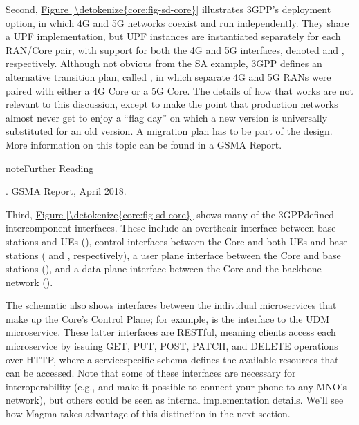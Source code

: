 \documentclass[a4paper,11pt,english]{sphinxmanual}
\begin{document}
\sphinxAtStartPar
Second, \hyperref[\detokenize{core:fig-sd-core}]{Figure \ref{\detokenize{core:fig-sd-core}}} illustrates 3GPP’s
 deployment option, in which 4G and 5G networks
co\sphinxhyphen{}exist and run independently. They share a UPF implementation, but
UPF instances are instantiated separately for each RAN/Core pair, with
support for both the 4G and 5G interfaces, denoted  and ,
respectively.  Although not obvious from the SA example, 3GPP defines
an alternative transition plan, called , in
which separate 4G and 5G RANs were paired with either a 4G Core or a
5G Core. The details of how that works are not relevant to this
discussion, except to make the point that production networks almost
never get to enjoy a “flag day” on which a new version is universally
substituted for an old version. A migration plan has to be part of the
design. More information on this topic can be found in a GSMA Report.

\label{\detokenize{core:reading-migration}}
\begin{sphinxadmonition}{note}{Further Reading}

\sphinxAtStartPar
{}.
GSMA Report, April 2018.
\end{sphinxadmonition}

\sphinxAtStartPar
Third, \hyperref[\detokenize{core:fig-sd-core}]{Figure \ref{\detokenize{core:fig-sd-core}}} shows many of the
3GPP\sphinxhyphen{}defined inter\sphinxhyphen{}component interfaces. These include an over\sphinxhyphen{}the\sphinxhyphen{}air
interface between base stations and UEs (), control interfaces
between the Core and both UEs and base stations ( and ,
respectively), a user plane interface between the Core and base
stations (), and a data plane interface between the Core and the
backbone network ().

\sphinxAtStartPar
The schematic also shows interfaces between the individual
microservices that make up the Core’s Control Plane; for example,
 is the interface to the UDM microservice.  These latter
interfaces are RESTful, meaning clients access each microservice by
issuing GET, PUT, POST, PATCH, and DELETE operations over HTTP, where
a service\sphinxhyphen{}specific schema defines the available resources that can be
accessed. Note that some of these interfaces are necessary for
interoperability (e.g.,  and  make it possible to connect
your phone to any MNO’s network), but others could be seen as internal
implementation details. We’ll see how Magma takes advantage of this
distinction in the next section.
\end{document}
